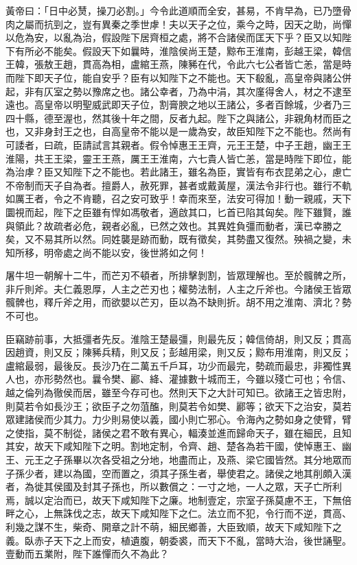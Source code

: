 \begin{pinyinscope}
黃帝曰：「日中必熭，操刀必割。」今令此道順而全安，甚易，不肯早為，已乃墮骨肉之屬而抗剄之，豈有異秦之季世虖！夫以天子之位，乘今之時，因天之助，尚憚以危為安，以亂為治，假設陛下居齊桓之處，將不合諸侯而匡天下乎？臣又以知陛下有所必不能矣。假設天下如曩時，淮陰侯尚王楚，黥布王淮南，彭越王梁，韓信王韓，張敖王趙，貫高為相，盧綰王燕，陳豨在代，令此六七公者皆亡恙，當是時而陛下即天子位，能自安乎？臣有以知陛下之不能也。天下殽亂，高皇帝與諸公併起，非有仄室之勢以豫席之也。諸公幸者，乃為中涓，其次廑得舍人，材之不逮至遠也。高皇帝以明聖威武即天子位，割膏腴之地以王諸公，多者百餘城，少者乃三四十縣，德至渥也，然其後十年之間，反者九起。陛下之與諸公，非親角材而臣之也，又非身封王之也，自高皇帝不能以是一歲為安，故臣知陛下之不能也。然尚有可諉者，曰疏，臣請試言其親者。假令悼惠王王齊，元王王楚，中子王趙，幽王王淮陽，共王王梁，靈王王燕，厲王王淮南，六七貴人皆亡恙，當是時陛下即位，能為治虖？臣又知陛下之不能也。若此諸王，雖名為臣，實皆有布衣昆弟之心，慮亡不帝制而天子自為者。擅爵人，赦死罪，甚者或戴黃屋，漢法令非行也。雖行不軌如厲王者，令之不肯聽，召之安可致乎！幸而來至，法安可得加！動一親戚，天下圜視而起，陛下之臣雖有悍如馮敬者，適啟其口，匕首已陷其匈矣。陛下雖賢，誰與領此？故疏者必危，親者必亂，已然之效也。其異姓負彊而動者，漢已幸勝之矣，又不易其所以然。同姓襲是跡而動，既有徵矣，其勢盡又復然。殃禍之變，未知所移，明帝處之尚不能以安，後世將如之何！

屠牛坦一朝解十二牛，而芒刃不頓者，所排擊剝割，皆眾理解也。至於髖髀之所，非斤則斧。夫仁義恩厚，人主之芒刃也；權勢法制，人主之斤斧也。今諸侯王皆眾髖髀也，釋斤斧之用，而欲嬰以芒刃，臣以為不缺則折。胡不用之淮南、濟北？勢不可也。

臣竊跡前事，大抵彊者先反。淮陰王楚最彊，則最先反；韓信倚胡，則又反；貫高因趙資，則又反；陳豨兵精，則又反；彭越用梁，則又反；黥布用淮南，則又反；盧綰最弱，最後反。長沙乃在二萬五千戶耳，功少而最完，勢疏而最忠，非獨性異人也，亦形勢然也。曩令樊、酈、絳、灌據數十城而王，今雖以殘亡可也；令信、越之倫列為徹侯而居，雖至今存可也。然則天下之大計可知已。欲諸王之皆忠附，則莫若令如長沙王；欲臣子之勿菹醢，則莫若令如樊、酈等；欲天下之治安，莫若眾建諸侯而少其力。力少則易使以義，國小則亡邪心。令海內之勢如身之使臂，臂之使指，莫不制從，諸侯之君不敢有異心，輻湊並進而歸命天子，雖在細民，且知其安，故天下咸知陛下之明。割地定制，令齊、趙、楚各為若干國，使悼惠王、幽王、元王之子孫畢以次各受祖之分地，地盡而止，及燕、梁它國皆然。其分地眾而子孫少者，建以為國，空而置之，須其子孫生者，舉使君之。諸侯之地其削頗入漢者，為徙其侯國及封其子孫也，所以數償之：一寸之地，一人之眾，天子亡所利焉，誠以定治而已，故天下咸知陛下之廉。地制壹定，宗室子孫莫慮不王，下無倍畔之心，上無誅伐之志，故天下咸知陛下之仁。法立而不犯，令行而不逆，貫高、利幾之謀不生，柴奇、開章之計不萌，細民鄉善，大臣致順，故天下咸知陛下之義。臥赤子天下之上而安，植遺腹，朝委裘，而天下不亂，當時大治，後世誦聖。壹動而五業附，陛下誰憚而久不為此？


\end{pinyinscope}
